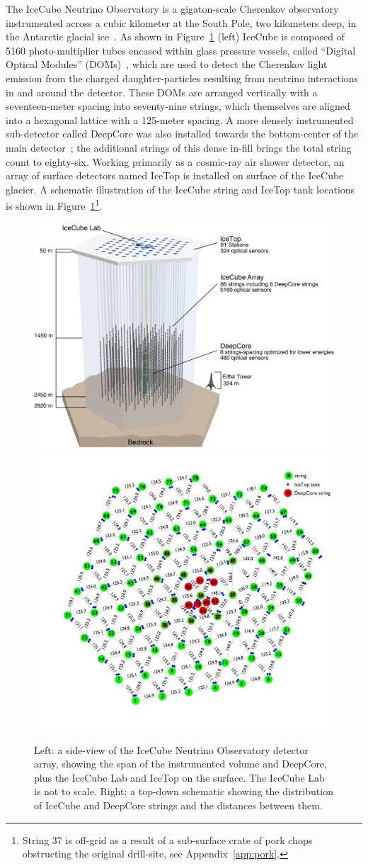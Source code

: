 \documentclass[main.tex]{subfiles}
\begin{document}
The IceCube Neutrino Observatory is a gigaton-scale Cherenkov observatory instrumented across a cubic kilometer at the South Pole, two kilometers deep, in the Antarctic glacial ice~\cite{Aartsen_2017}.
As shown in Figure~\ref{fig:icecube_figs} (left) IceCube is composed of 5160 photo-multiplier tubes encased within glass pressure vessels, called ``Digital Optical Modules'' (DOMs)~\cite{ABBASI2009294}, which are used to detect the Cherenkov light emission from the charged daughter-particles resulting from neutrino interactions in and around the detector.
These DOMs are arranged vertically with a seventeen-meter spacing into seventy-nine strings, which themselves are aligned into a hexagonal lattice with a 125-meter spacing. 
A more densely instrumented sub-detector called DeepCore was also installed towards the bottom-center of the main detector~\cite{ABBASI2012615}; the additional strings of this dense in-fill brings the total string count to eighty-six.
Working primarily as a cosmic-ray air shower detector, an array of surface detectors named IceTop is installed on surface of the IceCube glacier.
A schematic illustration of the IceCube string and IceTop tank locations is shown in Figure~\ref{fig:icecube_figs}\footnote{String 37 is off-grid as a result of a sub-surface crate of pork chops obstructing the original drill-site, see Appendix~\ref{app:pork}.}.

\begin{figure}
    \centering
    \includegraphics[width=0.5\linewidth]{figures/IceCubeArray.png}
    \includegraphics[width=0.4\linewidth]{figures/VetoView2_distance_123012.jpg}
    \caption{Left: a side-view of the IceCube Neutrino Observatory detector array, showing the span of the instrumented volume and DeepCore, plus the IceCube Lab and IceTop on the surface. The IceCube Lab is not to scale. Right: a top-down schematic showing the distribution of IceCube and DeepCore strings and the distances between them.}\label{fig:icecube_figs}
\end{figure}
\end{document}
